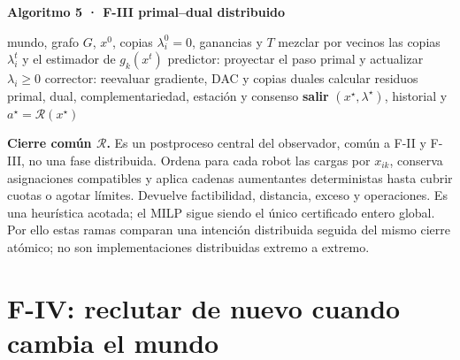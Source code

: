 \begin{tcolorbox}[colback=SPGreen!3,colframe=SPGreen!65,boxrule=.6pt,arc=1mm,
 left=2mm,right=2mm,top=1.4mm,bottom=1.4mm]
\textbf{Algoritmo 5 · F-III primal--dual distribuido}
\begin{algorithmic}[1]
\Require mundo, grafo $G$, $x^0$, copias $\lambda_i^0=0$, ganancias y $T$
  \State mezclar por vecinos las copias $\lambda_i^t$ y el estimador de $g_k(x^t)$
  \State predictor: proyectar el paso primal y actualizar $\lambda_i\ge0$
  \State corrector: reevaluar gradiente, DAC y copias duales
  \State calcular residuos primal, dual, complementariedad, estación y consenso
   \State \textbf{salir} \EndIf
\EndFor
\State \Return $(x^\star,\lambda^\star)$, historial y $a^\star=\mathcal R(x^\star)$
\end{algorithmic}
\end{tcolorbox}

\begin{tcolorbox}[colback=SPFloor,colframe=VIUOrange!80,boxrule=.6pt,arc=1mm,
 left=2mm,right=2mm,top=1.3mm,bottom=1.3mm]
\small
\textbf{Cierre común $\mathcal R$.} Es un postproceso central del observador,
común a F-II y F-III, no una fase distribuida. Ordena para cada robot las cargas por
$x_{ik}$, conserva asignaciones compatibles y aplica cadenas aumentantes
deterministas hasta cubrir cuotas o agotar límites. Devuelve factibilidad,
distancia, exceso y operaciones. Es una heurística acotada; el MILP sigue siendo
el único certificado entero global. Por ello estas ramas comparan una intención
distribuida seguida del mismo cierre atómico; no son implementaciones
distribuidas extremo a extremo.
\end{tcolorbox}

\clearpage

\section*{F-IV: reclutar de nuevo cuando cambia el mundo}
\enlargethispage{2\baselineskip}

